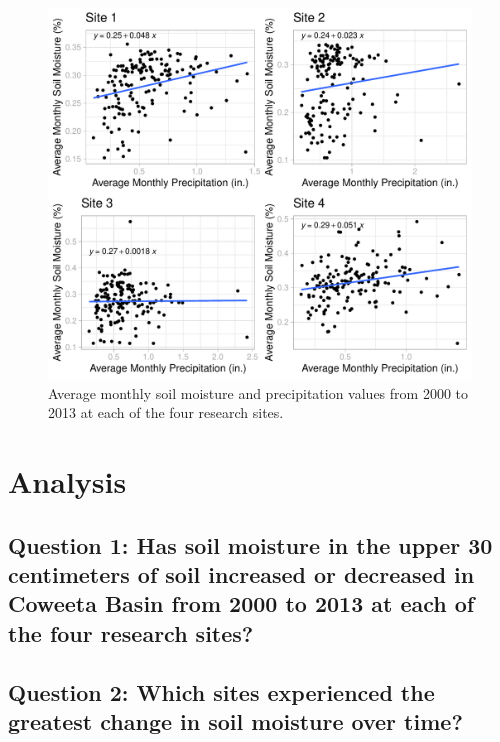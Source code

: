 \documentclass[
  12pt,
]{article}
\begin{document}
\begin{figure}
\centering
\includegraphics{Project_Report_Davidson_McClaugherty_Zungailia_files/figure-latex/Average Monthly Soil Moisture and Precipitation Cowplot-1.pdf}
\caption{Average monthly soil moisture and precipitation values from
2000 to 2013 at each of the four research sites.}
\end{figure}

\newpage

\hypertarget{analysis}{%
\section{Analysis}\label{analysis}}

\hypertarget{question-1-has-soil-moisture-in-the-upper-30-centimeters-of-soil-increased-or-decreased-in-coweeta-basin-from-2000-to-2013-at-each-of-the-four-research-sites}{%
\subsection{Question 1: Has soil moisture in the upper 30 centimeters of
soil increased or decreased in Coweeta Basin from 2000 to 2013 at each
of the four research
sites?}\label{question-1-has-soil-moisture-in-the-upper-30-centimeters-of-soil-increased-or-decreased-in-coweeta-basin-from-2000-to-2013-at-each-of-the-four-research-sites}}

\hypertarget{question-2-which-sites-experienced-the-greatest-change-in-soil-moisture-over-time}{%
\subsection{Question 2: Which sites experienced the greatest change in
soil moisture over
time?}\label{question-2-which-sites-experienced-the-greatest-change-in-soil-moisture-over-time}}
\end{document}
